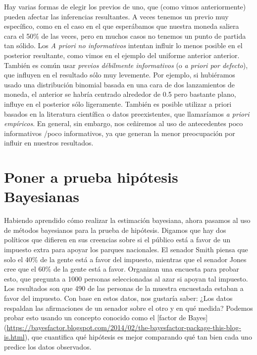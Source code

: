\documentclass[
  12pt,
]{book}
\theoremstyle{definition}
\theoremstyle{definition}
\theoremstyle{definition}
\theoremstyle{remark}
\begin{document}
Hay varias formas de elegir los previos de uno, que (como vimos anteriormente) pueden afectar las inferencias resultantes. A veces tenemos un previo muy específico, como en el caso en el que esperábamos que nuestra moneda saliera cara el 50\% de las veces, pero en muchos casos no tenemos un punto de partida tan sólido. Los \emph{A priori no informativos} intentan influir lo menos posible en el posterior resultante, como vimos en el ejemplo del uniforme anterior anterior. También es común usar \emph{previos débilmente informativos} (o \emph{a priori por defecto}), que influyen en el resultado sólo muy levemente. Por ejemplo, si hubiéramos usado una distribución binomial basada en una cara de dos lanzamientos de moneda, el anterior se habría centrado alrededor de 0.5 pero bastante plano, influye en el posterior sólo ligeramente.
También es posible utilizar a priori basados en la literatura científica o datos preexistentes, que llamaríamos \emph{a priori empíricos}. En general, sin embargo, nos ceñiremos al uso de antecedentes poco informativos /poco informativos, ya que generan la menor preocupación por influir en nuestros resultados.

\hypertarget{poner-a-prueba-hipuxf3tesis-bayesianas}{%
\section{Poner a prueba hipótesis Bayesianas}\label{poner-a-prueba-hipuxf3tesis-bayesianas}}

Habiendo aprendido cómo realizar la estimación bayesiana, ahora pasamos al uso de métodos bayesianos para la prueba de hipótesis. Digamos que hay dos políticos que difieren en sus creencias sobre si el público está a favor de un impuesto extra para apoyar los parques nacionales. El senador Smith piensa que solo el 40\% de la gente está a favor del impuesto, mientras que el senador Jones cree que el 60\% de la gente está a favor. Organizan una encuesta para probar esto, que pregunta a 1000 personas seleccionadas al azar si apoyan tal impuesto. Los resultados son que 490 de las personas de la muestra encuestada estaban a favor del impuesto. Con base en estos datos, nos gustaría saber: ¿Los datos respaldan las afirmaciones de un senador sobre el otro y en qué medida? Podemos probar esto usando un concepto conocido como el {[}factor de Bayes{]} (\url{https://bayesfactor.blogspot.com/2014/02/the-bayesfactor-package-this-blog-is.html}), que cuantifica qué hipótesis es mejor comparando qué tan bien cada uno predice los datos observados.
\end{document}
